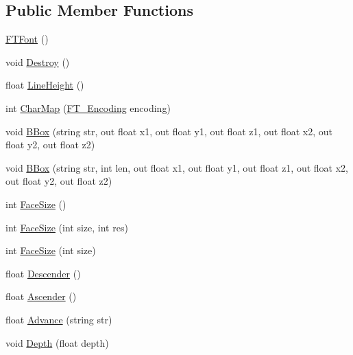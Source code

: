 \subsection*{Public Member Functions}
\begin{DoxyCompactItemize}
\item 
\hyperlink{class_tao_1_1_ft_gl_1_1_ft_gl_1_1_f_t_font_a46004ffd2b225934325bb45947dbdc38}{FTFont} ()
\item 
void \hyperlink{class_tao_1_1_ft_gl_1_1_ft_gl_1_1_f_t_font_ab9028c4aace7648b961eeaacf700afd4}{Destroy} ()
\item 
float \hyperlink{class_tao_1_1_ft_gl_1_1_ft_gl_1_1_f_t_font_a86ab336691731ffa37a7dc3217bd7492}{LineHeight} ()
\item 
int \hyperlink{class_tao_1_1_ft_gl_1_1_ft_gl_1_1_f_t_font_ae3b0cefd65957be938fb18076c81840d}{CharMap} (\hyperlink{namespace_tao_1_1_free_type_a87a3c6633d19c2af09744e5a3d0a51ed}{FT\_\-Encoding} encoding)
\item 
void \hyperlink{class_tao_1_1_ft_gl_1_1_ft_gl_1_1_f_t_font_a95e01ca23cdf074a1f9f7ca019210958}{BBox} (string str, out float x1, out float y1, out float z1, out float x2, out float y2, out float z2)
\item 
void \hyperlink{class_tao_1_1_ft_gl_1_1_ft_gl_1_1_f_t_font_a1451727b550abf2344bf110ddeaf8461}{BBox} (string str, int len, out float x1, out float y1, out float z1, out float x2, out float y2, out float z2)
\item 
int \hyperlink{class_tao_1_1_ft_gl_1_1_ft_gl_1_1_f_t_font_abee247a7e90dc2c3e46cb7ef02836663}{FaceSize} ()
\item 
int \hyperlink{class_tao_1_1_ft_gl_1_1_ft_gl_1_1_f_t_font_ab7f4656d0b96f7d4c334964687c364c8}{FaceSize} (int size, int res)
\item 
int \hyperlink{class_tao_1_1_ft_gl_1_1_ft_gl_1_1_f_t_font_a38061a3a420c847b2039e0b0972b0486}{FaceSize} (int size)
\item 
float \hyperlink{class_tao_1_1_ft_gl_1_1_ft_gl_1_1_f_t_font_a5f6ded89c89d6befae9af223ba45e197}{Descender} ()
\item 
float \hyperlink{class_tao_1_1_ft_gl_1_1_ft_gl_1_1_f_t_font_a25ed65ee6011fd2f4805f875402ea31e}{Ascender} ()
\item 
float \hyperlink{class_tao_1_1_ft_gl_1_1_ft_gl_1_1_f_t_font_a40e84b5de06d3a12124c0266a6d61e68}{Advance} (string str)
\item 
void \hyperlink{class_tao_1_1_ft_gl_1_1_ft_gl_1_1_f_t_font_afec637c0e7cc6cfaa2047066af6488cf}{Depth} (float depth)
\item 

\end{DoxyCompactItemize}
